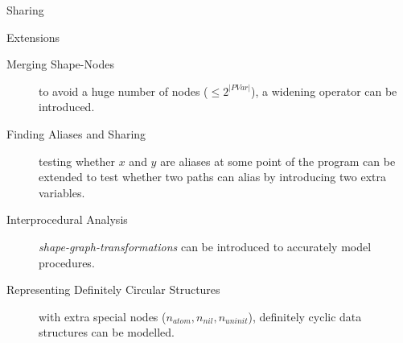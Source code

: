 \documentclass[xcolor={usenames,dvipsnames}]{beamer}
\begin{document}
\begin{frame}[fragile]{Sharing}
{    
  }
\end{frame}

\begin{frame}[fragile]{Extensions}
  \begin{description}
  \item[Merging Shape-Nodes] to avoid a huge number of nodes ($\leq 2^{|PVar|}$), a widening operator can be introduced.
  \item[Finding Aliases and Sharing] testing whether $x$ and $y$ are aliases at some point of the program can be extended to test whether two paths can alias by introducing two extra variables.
  \item[Interprocedural Analysis] \textit{shape-graph-transformations} can be introduced to accurately model procedures.
  \item[Representing Definitely Circular Structures] with extra special nodes ($n_{atom}, n_{nil}, n_{uninit}$), definitely cyclic data structures can be modelled.
  \end{description}
\end{frame}
\fi
\end{document}
